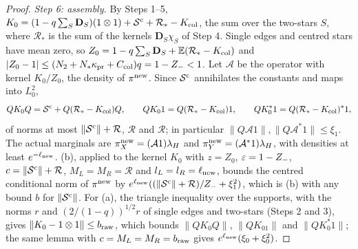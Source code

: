 \begin{proof}
\emph{Step 6: assembly.} By Steps 1--5,
$K_0=(1-q\sum_S\mathbf D_S)(1\otimes1)+\mathcal S^{\rm c}+\mathcal R_*-K_{\rm col}$,
the sum over the two-stars $S$, where $\mathcal R_*$ is the sum of the kernels
$\mathbf D_S\chi_S$ of Step 4. Single edges and centred stars have mean zero, so
$Z_0=1-q\sum_S\mathbf D_S+\mathbb E(\mathcal R_*-K_{\rm col})$ and
$|Z_0-1|\le(N_2+N_*\kappa_{\rm pr}+C_{\rm col})q=1-Z_-<1$. Let $\mathcal A$ be
the operator with kernel $K_0/Z_0$, the density of $\pi^{\rm new}$. Since
$\mathcal S^{\rm c}$ annihilates the constants and maps into $L^2_0$,
\[
 QK_0Q=\mathcal S^{\rm c}+Q(\mathcal R_*-K_{\rm col})Q,\qquad
 QK_01=Q(\mathcal R_*-K_{\rm col})1,\qquad
 QK_0^*1=Q(\mathcal R_*-K_{\rm col})^*1,
\]
of norms at most $\|\mathcal S^{\rm c}\|+\mathcal R$, $\mathcal R$ and
$\mathcal R$; in particular $\|Q\mathcal A1\|,\|Q\mathcal A^*1\|\le\xi_1$. The
actual marginals are $\pi^{\rm new}_X=(\mathcal A1)\lambda_H$ and
$\pi^{\rm new}_Y=(\mathcal A^*1)\lambda_H$, with densities at least
$e^{-\ell_{\rm new}}$. (b), applied to the kernel $K_0$
with $z=Z_0$, $\varepsilon=1-Z_-$, $c=\|\mathcal S^{\rm c}\|+\mathcal R$,
$M_L=M_R=\mathcal R$ and $l_L=l_R=\ell_{\rm new}$, bounds the centred
conditional norm of $\pi^{\rm new}$ by
$e^{\ell_{\rm new}}((\|\mathcal S^{\rm c}\|+\mathcal R)/Z_-+\xi_1^2)$, which is (b)
with any bound $b$ for $\|\mathcal S^{\rm c}\|$. For (a), the triangle
inequality over the supports, with the norms $r$ and $(2/(1-q))^{1/2}r$ of
single edges and two-stars (Steps 2 and 3), gives
$\|K_0-1\otimes1\|\le b_{\rm raw}$, which bounds $\|QK_0Q\|$, $\|QK_01\|$ and
$\|QK_0^*1\|$; the same lemma with $c=M_L=M_R=b_{\rm raw}$ gives
$e^{\ell_{\rm new}}(\xi_0+\xi_0^2)$.


\end{proof}
